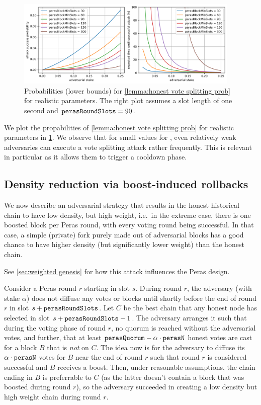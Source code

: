 \begin{figure}[h]
  \includegraphics[width=0.95\textwidth]{./appendix/plot-honest-vote-splitting.png}
  \centering
  \caption{Probabilities (lower bounds) for \cref{lemma:honest vote splitting prob} for realistic parameters. The right plot assumes a slot length of one second and $\mathtt{perasRoundSlots} = 90$.}\label{fig:honest vote splitting prob}
\end{figure}
We plot the propabilities of \cref{lemma:honest vote splitting prob} for realistic parameters in \cref{fig:honest vote splitting prob}.
We observe that for small values for \perasBlockMinSlots{}, even relatively weak adversaries can execute a vote splitting attack rather frequently.
This is relevant in particular as it allows them to trigger a cooldown phase.

\subsection{Density reduction via boost-induced rollbacks}\label{sec:density reduction via boost-induced rollbacks}

We now describe an adversarial strategy that results in the honest historical chain to have low density, but high weight, i.e.\ in the extreme case, there is one boosted block per Peras round, with every voting round being successful.
In that case, a simple (private) fork purely made out of adversarial blocks has a good chance to have higher density (but significantly lower weight) than the honest chain.

See \cref{sec:weighted genesis} for how this attack influences the Peras design.

Consider a Peras round $r$ starting in slot $s$.
During round $r$, the adversary (with stake $\alpha$) does not diffuse any votes or blocks until shortly before the end of round $r$ in slot $s+\mathtt{perasRoundSlots}$.
Let $C$ be the best chain that any honest node has selected in slot $s+\mathtt{perasRoundSlots}-1$.
The adversary arranges it such that during the voting phase of round $r$, no quorum is reached without the adversarial votes, and further, that at least $\mathtt{perasQuorum} - \alpha\cdot \mathtt{perasN}$ honest votes are cast for a block $B$ that is \emph{not} on $C$.
The idea now is for the adversary to diffuse its $\alpha\cdot\mathtt{perasN}$ votes for $B$ near the end of round $r$ such that round $r$ is considered successful and $B$ receives a boost.
Then, under reasonable assumptions, the chain ending in $B$ is preferrable to $C$ (as the latter doesn't contain a block that was boosted during round $r$), so the adversary succeeded in creating a low density but high weight chain during round $r$.

